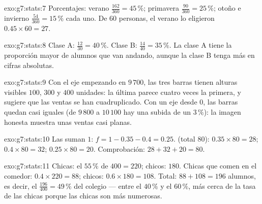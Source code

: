 \begin{solution}{exo:g7:stats:7}
Porcentajes: verano $\frac{162}{360} = 45\,\%$; primavera
$\frac{90}{360} = 25\,\%$; otoño e invierno
$\frac{54}{360} = 15\,\%$ cada uno. De $60$ personas, el verano lo eligieron
$0.45 \times 60 = 27$.
\end{solution}

\begin{solution}{exo:g7:stats:8}
Clase A: $\frac{12}{30} = 40\,\%$. Clase B: $\frac{14}{40} = 35\,\%$.
La clase A tiene la proporción mayor de alumnos que van andando, aunque la clase B
tenga más en cifras absolutas.
\end{solution}

\begin{solution}{exo:g7:stats:9}
Con el eje empezando en $9\,700$, las tres barras tienen alturas
visibles $100$, $300$ y $400$ unidades: la última parece cuatro veces la
primera, y sugiere que las ventas se han cuadruplicado. Con un eje desde $0$, las barras
quedan casi iguales (de $9\,800$ a $10\,100$ hay una subida de un $3\,\%$):
la imagen honesta muestra unas ventas casi planas.
\end{solution}

\begin{solution}{exo:g7:stats:10}
Las  suman $1$: $f = 1 - 0.35 - 0.4 = 0.25$.  (total
$80$): $0.35 \times 80 = 28$; $0.4 \times 80 = 32$;
$0.25 \times 80 = 20$. Comprobación: $28 + 32 + 20 = 80$.
\end{solution}

\begin{solution}{exo:g7:stats:11}
Chicas: el $55\,\%$ de $400 = 220$; chicos: $180$. Chicas que comen en el comedor:
$0.4 \times 220 = 88$; chicos: $0.6 \times 180 = 108$. Total:
$88 + 108 = 196$ alumnos, es decir, el $\frac{196}{400} = 49\,\%$ del
colegio --- entre el $40\,\%$ y el $60\,\%$, más cerca de la tasa de las chicas
porque las chicas son más numerosas.
\end{solution}

